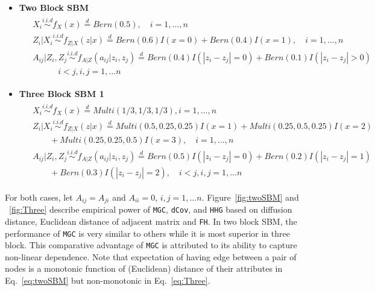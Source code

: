 \documentclass[12pt]{article}
\theoremstyle{definition}
\begin{document}
\begin{itemize}	
\item \textbf{Two Block SBM}	
\begin{equation}
\begin{gathered}
\begin{aligned}
&	X_{i}  \overset{i.i.d}{\sim} f_{X}(x)  \stackrel{d}{=}  Bern(0.5), \quad   i = 1, \ldots , n \\ 
&	Z_{i} | X_{i}   \overset{i.i.d}{\sim}    f_{Z|X}(z|x)  \stackrel{d}{=}  Bern(0.6) I( x = 0 ) +   Bern(0.4) I (x = 1), \quad  i = 1,\ldots,n  \\
&	A_{ij} | Z_{i}, Z_{j}   \overset{i.i.d}{\sim}   f_{A|Z}(a_{ij} | z_{i}, z_{j}) \stackrel{d}{=}  Bern(0.4) I ( |z_{i} - z_{j}| = 0 )  + Bern(0.1) I(|z_{i} - z_{j}| > 0) \\ & \quad \quad \quad i < j, i,j=1, \ldots n 
\end{aligned}
\end{gathered}
	\label{eq:twoSBM}
\end{equation} 
	
\item \textbf{Three Block SBM 1}
\begin{equation}
\label{eq:Three}
\begin{gathered}
\begin{aligned}
&  X_{i} \overset{i.i.d}{\sim} f_{X}(x)   \stackrel{d}{=}  Multi(1/3, 1/3, 1/3), i = 1, \ldots , n \\ 
&  Z_{i} | X_{i}  \overset{i.i.d}{\sim}    f_{Z|X}(z|x)  \stackrel{d}{=}   Multi(0.5, 0.25, 0.25) I( x = 1 ) +   Multi(0.25, 0.5, 0.25) I (x = 2)  \qquad  \\ & \quad \quad + Multi(0.25, 0.25, 0.5)I(x = 3), \quad  i = 1,\ldots,n  \\
&  A_{ij} | Z_{i}, Z_{j}   \overset{i.i.d}{\sim}   f_{A|Z}(a_{ij} | z_{i}, z_{j}) \stackrel{d}{=}  Bern(0.5) I ( |z_{i} - z_{j}| = 0 )  + Bern(0.2) I(|z_{i} - z_{j}| = 1) \\ & \quad \quad + Bern(0.3) I (|z_{i} - z_{j}| = 2),  \quad i < j, i,j=1, \ldots n 
\end{aligned}
\end{gathered}
\end{equation}
\end{itemize}
For both cases, let $A_{ij} = A_{ji}$ and $A_{ii} = 0$, $i,j=1, \ldots n$. Figure~\ref{fig:twoSBM} and ~\ref{fig:Three} describe empirical power of \texttt{MGC}, \texttt{dCov}, and \texttt{HHG} based on diffusion distance, Euclidean distance of adjacent matrix and \texttt{FH}. In two block SBM, the performance of \texttt{MGC} is very similar to others while it is most superior in three block. This comparative advantage of \texttt{MGC} is attributed to its ability to capture non-linear dependence. Note that expectation of having edge between a pair of nodes is a monotonic function of (Euclidean) distance of their attributes in Eq.~\ref{eq:twoSBM} but non-monotonic in Eq.~\ref{eq:Three}. 
\end{document}
